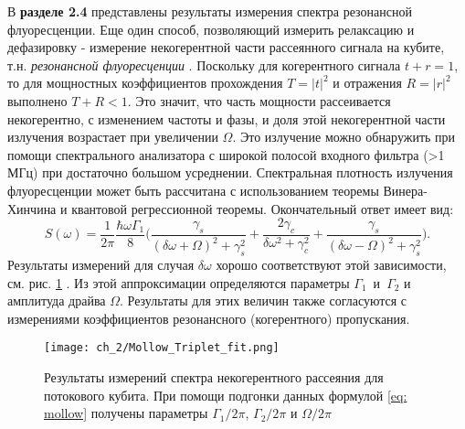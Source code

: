 В \textbf{разделе 2.4} представлены результаты измерения спектра резонансной флуоресценции. Еще один способ, позволяющий измерить релаксацию и дефазировку - измерение некогерентной части рассеянного сигнала на кубите, т.н. \textit{резонансной флуоресценции} \cite{Astafiev2010resonance,Mollow}. Поскольку для когерентного сигнала $t+r=1$, то для мощностных коэффициентов прохождения $T=|t|^2$ и отражения $R=|r|^2$ выполнено $T+R <1$. Это значит, что часть мощности рассеивается некогерентно, с изменением частоты и фазы, и доля этой некогерентной части излучения возрастает при увеличении $\Omega$.  Это излучение можно обнаружить при помощи спектрального анализатора с широкой полосой входного фильтра (>1 МГц) при достаточно большом усреднении. Спектральная плотность излучения флуоресценции может быть рассчитана с использованием теоремы Винера-Хинчина и квантовой регрессионной теоремы. Окончательный ответ \cite{Astafiev2010resonance, abdumalikov2011dynamics} имеет вид:
\begin{equation}
S(\omega) = \frac{1}{2\pi}\frac{\hbar \omega\Gamma_1}{8}\Big(\frac{\gamma_s}{(\delta\omega+\Omega)^2+\gamma_s^2}+\frac{2\gamma_c}{\delta\omega^2+\gamma_c^2}+\frac{\gamma_s}{(\delta\omega-\Omega)^2+\gamma_s^2}\Big).
\label{eq: mollow}
\end{equation}
Результаты измерений для случая $\delta\omega$ хорошо соответствуют этой зависимости, см. рис. \ref{fig: mollow} .  Из этой аппроксимации определяются параметры $\Gamma_1$~и~$\Gamma_2$ и амплитуда драйва $\Omega$. Результаты для этих величин также согласуются с измерениями коэффициентов резонансного (когерентного) пропускания.  
\begin{figure}[htb]\center
	\texttt{[image: ch\_2/Mollow\_Triplet\_fit.png]} \hfill
	\caption[width=0.6\textwidth]{Результаты измерений спектра некогерентного рассеяния для потокового кубита. При помощи подгонки данных формулой \eqref{eq: mollow} получены параметры $\Gamma_1/2\pi$, $\Gamma_2/2\pi$ и $\Omega/2\pi$ }
	\label{fig: mollow}
\end{figure}

